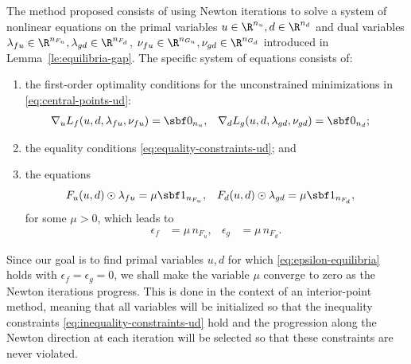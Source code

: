 \documentclass[11pt]{article}
\begin{document}
The method proposed consists of using Newton iterations to solve a
system of nonlinear equations on the primal variables
$u\in\R^{n_u},d\in\R^{n_d}$ and dual variables
$\lambda_{fu}\in\R^{n_{F_u}},\lambda_{gd}\in\R^{n_{F_d}}$,
$\nu_{fu}\in\R^{n_{G_u}},\nu_{gd}\in\R^{n_{G_d}}$ introduced in
Lemma~\ref{le:equilibria-gap}. The specific system of equations
consists of:
\begin{enumerate}
\item the first-order optimality conditions for the unconstrained
  minimizations in \eqref{eq:central-points-ud}:
  \begin{align}\label{eq:equilibrium}
    \nabla_u L_f(u,d,\lambda_{fu},\nu_{fu})&=\sbf 0_{n_u}, &
    \nabla_d L_g(u,d,\lambda_{gd},\nu_{gd})&=\sbf 0_{n_d}; &
  \end{align}
\item the equality conditions \eqref{eq:equality-constraints-ud}; and
\item the equations
  \begin{align}\label{eq:barrier-ud}
    F_u(u,d)\odot\lambda_{fu}&=\mu\sbf 1_{n_{F_u}}, &
    F_d(u,d)\odot\lambda_{gd}&=\mu\sbf 1_{n_{F_d}}, &
  \end{align}
  for some $\mu>0$, which leads to
  \begin{align*}
    \epsilon_f&=\mu\, n_{F_u} , & \epsilon_g&=\mu\, n_{F_d} .
  \end{align*}
\end{enumerate}
Since our goal is to find primal variables $u,d$ for which
\eqref{eq:epsilon-equilibria} holds with $\epsilon_f=\epsilon_g=0$, we shall make
the variable $\mu$ converge to zero as the Newton iterations
progress. This is done in the context of an interior-point method,
meaning that all variables will be initialized so that the inequality
constraints \eqref{eq:inequality-constraints-ud} hold and the progression
along the Newton direction at each iteration will be selected so that
these constraints are never violated.

\medskip
\end{document}
